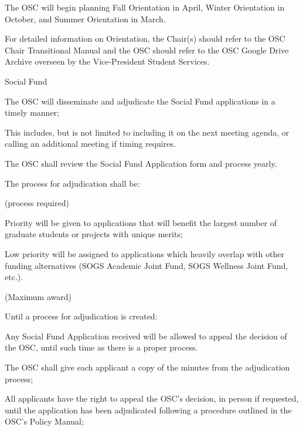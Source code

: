 \begin{longenum}[ label*=\thesubsection.\arabic*., align=left]
\begin{longenum}[label*=\arabic*., align=left]
		\item The OSC will begin planning Fall Orientation in April, Winter Orientation in October, and Summer Orientation in March.
		\item For detailed information on Orientation, the Chair(s) should refer to the OSC Chair Transitional Manual and the OSC should refer to the OSC Google Drive Archive overseen by the Vice-President Student Services.				
		\end{longenum}
	\item Social Fund
		\begin{longenum}[label*=\arabic*., align=left]
		\item The OSC will disseminate and adjudicate the Social Fund applications in a timely manner;
			\begin{longenum}[label*=\arabic*., align=left]
			\item This includes, but is not limited to including it on the next meeting agenda, or calling an additional meeting if timing requires.
			\end{longenum}
		\item The OSC shall review the Social Fund Application form and process yearly.
		\item The process for adjudication shall be:				
			\begin{longenum}[label*=\arabic*., align=left]
			\item (process required)
			\item Priority will be given to applications that will benefit the largest number of graduate students or projects with unique merits;	
			\item Low priority will be assigned to applications which heavily overlap with other funding alternatives (SOGS Academic Joint Fund, SOGS Wellness Joint Fund, etc.).			
			\item (Maximum award)			
			\item Until a process for adjudication is created:			
				\begin{longenum}[label*=\arabic*., align=left]
				\item Any Social Fund Application received will be allowed to appeal the decision of the OSC, until such time as there is a proper process.
					\begin{longenum}[label*=\arabic*., align=left]
					\item The OSC shall give each applicant a copy of the minutes from the adjudication process;
					\item All applicants have the right to appeal the OSC's decision, in person if requested, until the application has been adjudicated following a procedure outlined in the OSC's Policy Manual;

\end{longenum}
\end{longenum}
\end{longenum}
\end{longenum}
\end{longenum}
